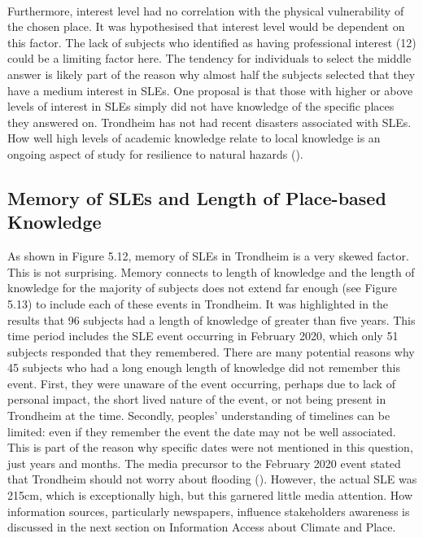 \paragraph{}
Furthermore, interest level had no correlation with the physical vulnerability of the chosen place. It was hypothesised that interest level would be dependent on this factor. The lack of subjects who identified as having professional interest (12) could be a limiting factor here. The tendency for individuals to select the middle answer is likely part of the reason why almost half the subjects selected that they have a medium interest in SLEs. One proposal is that those with higher or above levels of interest in SLEs simply did not have knowledge of the specific places they answered on. Trondheim has not had recent disasters associated with SLEs. How well high levels of academic knowledge relate to local knowledge is an ongoing aspect of study for resilience to natural hazards (\cite{lujala_role_2020}).
\paragraph{}



   

\subsection{Memory of SLEs and Length of Place-based Knowledge}
As shown in Figure 5.12, memory of SLEs in Trondheim is a very skewed factor. This is not surprising. Memory connects to length of knowledge and the length of knowledge for the majority of subjects does not extend far enough (see Figure 5.13) to include each of these events in Trondheim. It was highlighted in the results that 96 subjects had a length of knowledge of greater than five years. This time period includes the SLE event occurring in February 2020, which only 51 subjects responded that they remembered. There are many potential reasons why 45 subjects who had a long enough length of knowledge did not remember this event. First, they were unaware of the event occurring, perhaps due to lack of personal impact, the short lived nature of the event, or not being present in Trondheim at the time. Secondly, peoples' understanding of timelines can be limited: even if they remember the event the date may not be well associated. This is part of the reason why specific dates were not mentioned in this question, just years and months. The media precursor to the February 2020 event stated that Trondheim should not worry about flooding (\cite{baisotti_danger_2020}). However, the actual SLE was 215cm, which is exceptionally high, but this garnered little media attention. How information sources, particularly newspapers, influence stakeholders awareness is discussed in the next section on Information Access about Climate and Place.
